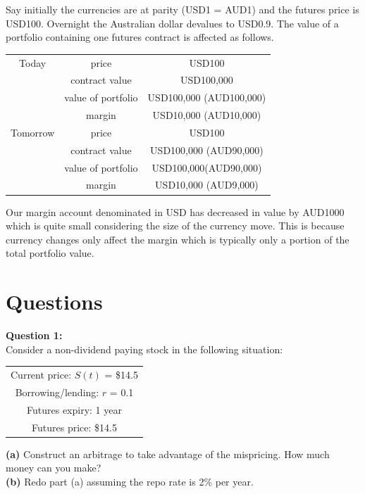 Say initially the currencies are at parity (USD1 = AUD1) and the futures price is USD100. Overnight the Australian dollar devalues to USD0.9. The value of a portfolio containing one futures contract is affected as follows.


\begin{center} \begin{tabular}{|c|c|c|}
  \hline
  Today& price & USD100 \\
  & contract value & USD100,000 \\
  & value of portfolio & USD100,000 (AUD100,000) \\
  & margin & USD10,000 (AUD10,000) \\
   \hline
  Tomorrow & price & USD100 \\
  & contract value & USD100,000 (AUD90,000) \\
  & value of portfolio &USD100,000(AUD90,000)  \\
  & margin & USD10,000 (AUD9,000) \\
  \hline
\end{tabular}\end{center}

Our margin account denominated in USD has decreased in value by AUD1000 which is quite small considering the size of the currency move. This is because currency changes only affect the margin which is typically only a portion of the total portfolio value.


\section{Questions}

\textbf{Question 1:}\\

Consider a non-dividend paying stock in the following situation:

\begin{center}
\begin{tabular}{|c|}
\hline
Current price: $S(t)$ = \$14.5\\
Borrowing/lending: $r$ = 0.1\\
Futures expiry: 1 year\\
Futures price: \$14.5\\
\hline
\end{tabular}
\end{center}

\textbf{(a)} Construct an arbitrage to take advantage of the mispricing. How much money can you make?\\
\textbf{(b)} Redo part (a) assuming the repo rate is 2\% per year.

